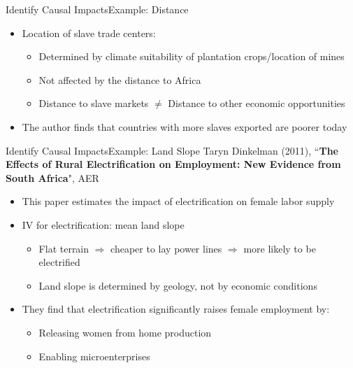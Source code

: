 \documentclass[hyperref={pdfpagelabels=false}]{beamer}
\begin{document}
\begin{frame}{Identify Causal Impacts}{Example: Distance}	
	\begin{itemize}
		\item Location of slave trade centers:
		\begin{itemize}
			\vspace{0.2cm}
			\item Determined by climate suitability of plantation crops/location of mines
			\vspace{0.2cm}
			\item Not affected by the distance to Africa
			\vspace{0.2cm}
			\item Distance to slave markets $\neq$ Distance to other economic opportunities
			\vspace{0.2cm}
		\end{itemize}
		\item The author finds that countries with more slaves exported are poorer today
	\end{itemize}
\end{frame}





\begin{frame}{Identify Causal Impacts}{Example: Land Slope}
    Taryn Dinkelman (2011), ``\textbf{The Effects of Rural 
    Electrification on Employment: New Evidence from South Africa}", AER
    \begin{itemize}
        \item This paper estimates the impact of electrification 
        on female labor supply
        \vspace{0.2cm}
        \item IV for electrification: mean land slope
        \vspace{0.2cm}
        \begin{itemize}
            \item Flat terrain $\Rightarrow$ cheaper to lay power lines 
            $\Rightarrow$ more likely to be electrified
            \vspace{0.2cm}
            \item Land slope is determined by geology, 
            not by economic conditions
        \end{itemize}
        \vspace{0.2cm}
        \item They find that electrification significantly raises 
        female employment by:
        \begin{itemize}
            \vspace{0.2cm}
            \item Releasing women from home production
            \vspace{0.2cm}
            \item Enabling microenterprises
        \end{itemize}
    \end{itemize}
\end{frame}
\end{document}
